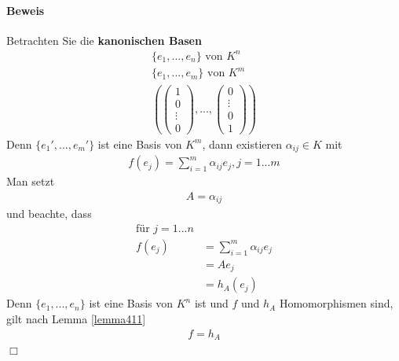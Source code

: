 \documentclass[11pt]{report}
\newcommand*\f[1] {\textbf{#1}}
\begin{document}
\paragraph{Beweis}
Betrachten Sie die \f{kanonischen Basen}
\begin{align}
 \{e_1, ..., e_n\} \text{ von } K^n \\
 \{e_1, ..., e_m\} \text{ von } K^m \\
\left( \begin{pmatrix} 1 \\ 0 \\ \vdots \\ 0 \end{pmatrix}, ..., \begin{pmatrix}0 \\ \vdots \\ 0 \\ 1 \end{pmatrix}\right) 
\end{align}
Denn $\{e_1', ..., e_m'\}$ ist eine Basis von $K^m$, dann existieren $\alpha_{ij} \in K$ mit 
\begin{align}
 f(e_j) = \sum_{i=1}^m \alpha_{ij} e_j, j=1...m
\end{align}
Man setzt
\begin{align}
 A = \alpha_{ij}
\end{align}
und beachte, dass 
\begin{align}
 \text{für } j=1...n \\
f(e_j) &= \sum_{i=1}^m \alpha_{ij} e_j \\
 &= A e_{j} \\
 &= h_A (e_j)
\end{align}
Denn $\{e_1, ..., e_n\}$ ist eine Basis von $K^n$ ist und $f$ und $h_A$ Homomorphismen sind, gilt nach Lemma \ref{lemma411}
\begin{align}
 f = h_A
\end{align}
\hspace*{1cm} \hfill $\Box$


\end{document}

